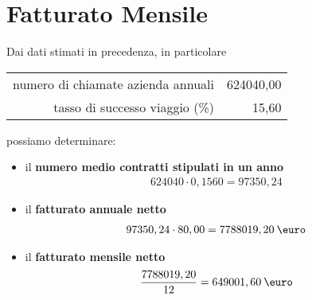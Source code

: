 \section[Fatturato Mensile]{Fatturato Mensile}
Dai dati stimati in precedenza, in particolare
\newline
\begin{center}
	\begin{tabular}{rr}
		numero di chiamate azienda annuali & 624040,00 \\
		tasso di successo viaggio (\%) & 15,60 \\ 
	\end{tabular}
\end{center}
possiamo determinare:
\begin{itemize}
\item il \textbf{numero medio contratti stipulati in un anno}
	\begin{equation}
	\label{eq:num_contratti_anno}
	\begin{split}
		624040 \cdot 0,1560 = 97350,24
	\end{split}
	\end{equation}
\item il \textbf{fatturato annuale netto}
	\begin{equation}
	\label{eq:fatturato_anno_netto}
	\begin{split}
		97350,24 \cdot 80,00 = 7788019,20 \: \mbox{\euro} 
	\end{split}
	\end{equation}
\item il \textbf{fatturato mensile netto} 
	\begin{equation}
	\label{eq:fatturato_mensile_netto}
	\begin{split}
		\frac{7788019,20}{12} = 649001,60 \: \mbox{\euro}
	\end{split}
	\end{equation}
\end{itemize}